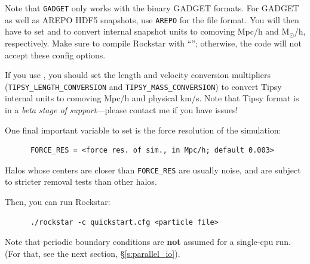\documentclass[12pt]{article}
\begin{document}
      Note that \texttt{GADGET} only works with the binary GADGET formats.  For GADGET
      as well as AREPO HDF5 snapshots, use \texttt{AREPO} for the file format.  You will then have to
      set  and
       to convert internal snapshot units to comoving Mpc/h
      and M$_\odot$/h, respectively.  Make sure to compile Rockstar with ``'';
      otherwise, the code will not accept these config options.

      If you use , you should set the length and velocity
      conversion multipliers (\texttt{TIPSY\_LENGTH\_CONVERSION} and \texttt{TIPSY\_MASS\_CONVERSION})
      to convert Tipsy internal units to comoving Mpc/h and physical km/s.
      Note that Tipsy format is in a \textit{beta stage of support}---please contact
       me if you have issues!
       
       One final important variable to set is the force resolution of the simulation:
\begin{verbatim}
      FORCE_RES = <force res. of sim., in Mpc/h; default 0.003>
\end{verbatim}
	Halos whose centers are closer than \texttt{FORCE\_RES} are usually noise, and are subject to stricter removal tests than other halos.

      Then, you can run Rockstar:
      \begin{verbatim}
      ./rockstar -c quickstart.cfg <particle file>
\end{verbatim}      
      Note that periodic boundary conditions are \textbf{not} assumed for a single-cpu
      run.  (For that, see the next section, \S \ref{s:parallel_io}).
\end{document}

